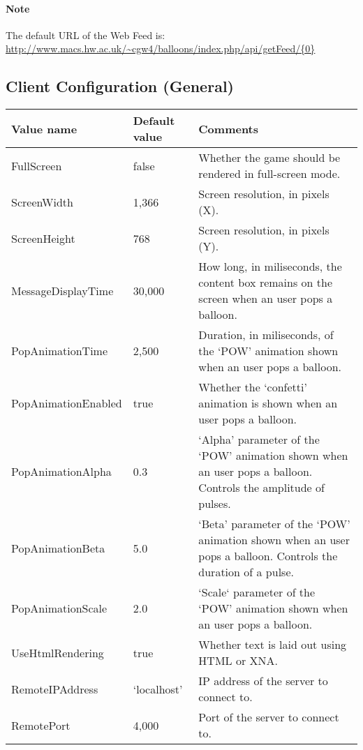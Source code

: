 \paragraph{Note}

The default URL of the Web Feed is:\\ \url{http://www.macs.hw.ac.uk/~cgw4/balloons/index.php/api/getFeed/{0}}

\clearpage{}

\subsection{Client Configuration (General)}

\begin{tabular}{|p{5.0cm}|p{3.0cm}|p{7.6cm}|}

\hline Value name & Default value & Comments \\ \hline

FullScreen & false & Whether the game should be rendered in full-screen mode. \\ \hline

ScreenWidth & 1,366 & Screen resolution, in pixels (X). \\ \hline

ScreenHeight & 768 & Screen resolution, in pixels (Y). \\ \hline

MessageDisplayTime & 30,000 & How long, in miliseconds, the content box remains on the screen when an user pops a balloon. \\ \hline

PopAnimationTime & 2,500 & Duration, in miliseconds, of the `POW' animation shown when an user pops a balloon. \\ \hline

PopAnimationEnabled & true & Whether the `confetti' animation is shown when an user pops a balloon. \\ \hline

PopAnimationAlpha & 0.3 & `Alpha' parameter of the `POW' animation shown when an user pops a balloon. \newline Controls the amplitude of pulses. \\ \hline

PopAnimationBeta & 5.0 & `Beta' parameter of the `POW' animation shown when an user pops a balloon. \newline Controls the duration of a pulse. \\ \hline

PopAnimationScale & 2.0 & `Scale` parameter of the `POW' animation shown when an user pops a balloon. \\ \hline

UseHtmlRendering & true & Whether text is laid out using HTML or XNA. \\ \hline

RemoteIPAddress & `localhost' & IP address of the server to connect to. \\ \hline

RemotePort & 4,000 & Port of the server to connect to. \\ \hline

\end{tabular}

